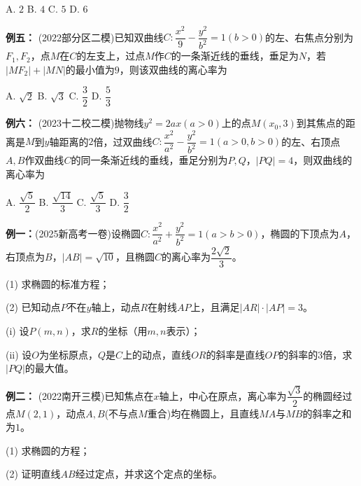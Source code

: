 \documentclass{article}
\begin{document}
A. $2$ \quad B. $4$ \quad C. $5$ \quad D. $6$
\vspace{3\baselineskip}

\noindent\textbf{例五：} (2022部分区二模)已知双曲线$C:\dfrac{x^2}{9}-\dfrac{y^2}{b^2}=1(b>0)$的左、右焦点分别为$F_1,F_2$，点$M$在$C$的左支上，过点$M$作$C$的一条渐近线的垂线，垂足为$N$，若$|MF_2|+|MN|$的最小值为$9$，则该双曲线的离心率为
\vspace{0.5em}

A. $\sqrt{2}$ \quad B. $\sqrt{3}$ \quad C. $\dfrac{3}{2}$ \quad D. $\dfrac{5}{3}$
\vspace{3\baselineskip}

\noindent\textbf{例六：} (2023十二校二模)抛物线$y^2=2ax(a>0)$上的点$M(x_0,3)$到其焦点的距离是$M$到$y$轴距离的$2$倍，过双曲线$C:\dfrac{x^2}{a^2}-\dfrac{y^2}{b^2}=1(a>0,b>0)$的左、右顶点$A,B$作双曲线$C$的同一条渐近线的垂线，垂足分别为$P,Q$，$|PQ|=4$，则双曲线的离心率为
\vspace{0.5em}

A. $\dfrac{\sqrt{5}}{2}$ \quad B. $\dfrac{\sqrt{14}}{3}$ \quad C. $\dfrac{\sqrt{5}}{3}$ \quad D. $\dfrac{3}{2}$
\newpage

\noindent\textbf{例一：}(2025新高考一卷)设椭圆$C:\dfrac{x^2}{a^2}+\dfrac{y^2}{b^2}=1(a>b>0)$，椭圆的下顶点为$A$，右顶点为$B$，$|AB|=\sqrt{10}$，且椭圆$C$的离心率为$\dfrac{2\sqrt{2}}{3}$。
\vspace{0.5em}

(1) 求椭圆的标准方程；
\vspace{1\baselineskip}

(2) 已知动点$P$不在$y$轴上，动点$R$在射线$AP$上，且满足$|AR|\cdot|AP|=3$。
\vspace{0.5em}

(i) 设$P(m,n)$，求$R$的坐标（用$m,n$表示）；
\vspace{1\baselineskip}

(ii) 设$O$为坐标原点，$Q$是$C$上的动点，直线$OR$的斜率是直线$OP$的斜率的$3$倍，求$|PQ|$的最大值。
\vspace{20\baselineskip}

\noindent\textbf{例二：} (2022南开三模)已知焦点在$x$轴上，中心在原点，离心率为$\dfrac{\sqrt{3}}{2}$的椭圆经过点$M(2,1)$，动点$A,B$(不与点$M$重合)均在椭圆上，且直线$MA$与$MB$的斜率之和为$1$。
\vspace{0.5em}

(1) 求椭圆的方程；
\vspace{1\baselineskip}

(2) 证明直线$AB$经过定点，并求这个定点的坐标。
\vspace{2\baselineskip}
\end{document}
